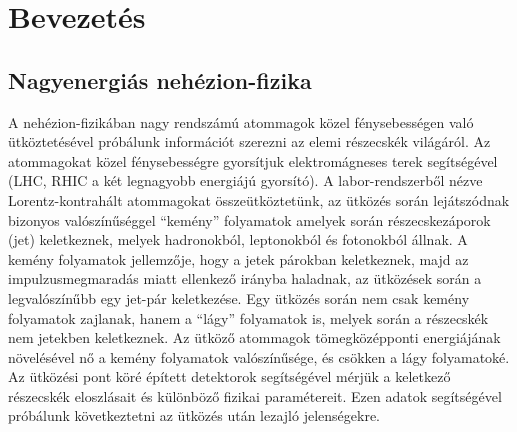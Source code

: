 \documentclass[10pt,a4paper]{article}
\numberwithin{equation}{subsection}
\numberwithin{figure}{section}
\begin{document}

\newpage
\tableofcontents

\clearpage
\pagestyle{plain}
\setcounter{page}{1}



\section{Bevezetés}

\subsection{Nagyenergiás nehézion-fizika}



A nehézion-fizikában nagy rendszámú atommagok közel fénysebességen való ütköztetésével próbálunk információt szerezni az elemi részecskék világáról. Az atommagokat közel fénysebességre gyorsítjuk elektromágneses terek segítségével (LHC, RHIC a két legnagyobb energiájú gyorsító). A labor-rendszerből nézve Lorentz-kontrahált atommagokat összeütköztetünk,  az ütközés során lejátszódnak bizonyos valószínűséggel ``kemény'' folyamatok amelyek során részecskezáporok (jet) keletkeznek, melyek hadronokból, leptonokból és fotonokból állnak. A kemény folyamatok jellemzője, hogy a jetek párokban keletkeznek, majd az impulzusmegmaradás miatt ellenkező irányba haladnak, az ütközések során a legvalószínűbb egy jet-pár keletkezése. Egy ütközés során nem csak kemény folyamatok zajlanak, hanem a ``lágy'' folyamatok is, melyek során a részecskék nem jetekben keletkeznek. Az ütköző atommagok tömegközépponti energiájának növelésével nő a kemény folyamatok valószínűsége, és csökken a lágy folyamatoké. Az ütközési pont köré épített detektorok segítségével mérjük a keletkező részecskék eloszlásait és különböző fizikai paramétereit. Ezen adatok segítségével próbálunk következtetni az ütközés után lezajló jelenségekre.
\end{document}
